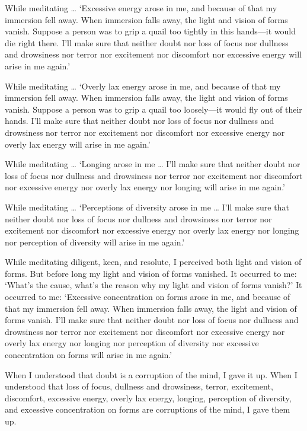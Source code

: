 \documentclass[12pt,openany]{book}%
\begin{document}
While meditating … ‘Excessive energy arose in me, and because of that my immersion fell away. When immersion falls away, the light and vision of forms vanish. Suppose a person was to grip a quail too tightly in this hands—it would die right there. I’ll make sure that neither doubt nor loss of focus nor dullness and drowsiness nor terror nor excitement nor discomfort nor excessive energy will arise in me again.’ 

While meditating … ‘Overly lax energy arose in me, and because of that my immersion fell away. When immersion falls away, the light and vision of forms vanish. Suppose a person was to grip a quail too loosely—it would fly out of their hands. I’ll make sure that neither doubt nor loss of focus nor dullness and drowsiness nor terror nor excitement nor discomfort nor excessive energy nor overly lax energy will arise in me again.’ 

While meditating … ‘Longing arose in me … I’ll make sure that neither doubt nor loss of focus nor dullness and drowsiness nor terror nor excitement nor discomfort nor excessive energy nor overly lax energy nor longing will arise in me again.’ 

While meditating … ‘Perceptions of diversity arose in me … I’ll make sure that neither doubt nor loss of focus nor dullness and drowsiness nor terror nor excitement nor discomfort nor excessive energy nor overly lax energy nor longing nor perception of diversity will arise in me again.’ 

While meditating diligent, keen, and resolute, I perceived both light and vision of forms. But before long my light and vision of forms vanished. It occurred to me: ‘What’s the cause, what’s the reason why my light and vision of forms vanish?’ It occurred to me: ‘Excessive concentration on forms arose in me, and because of that my immersion fell away. When immersion falls away, the light and vision of forms vanish. I’ll make sure that neither doubt nor loss of focus nor dullness and drowsiness nor terror nor excitement nor discomfort nor excessive energy nor overly lax energy nor longing nor perception of diversity nor excessive concentration on forms will arise in me again.’ 

When I understood that doubt is a corruption of the mind, I gave it up. When I understood that loss of focus, dullness and drowsiness, terror, excitement, discomfort, excessive energy, overly lax energy, longing, perception of diversity, and excessive concentration on forms are corruptions of the mind, I gave them up. 
\end{document}
